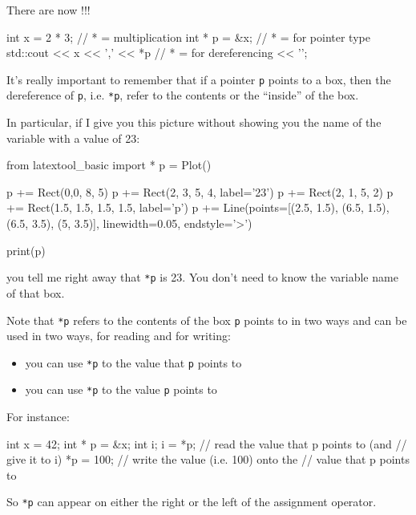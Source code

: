 
There are now !!!

\begin{consolethree}[escapeinside=||]
int x = 2 * 3;           // * = multiplication
int * p = &x;            // * = for pointer type
std::cout << x
          << ',' << *p   // * = for dereferencing
          << '\n';
\end{consolethree}
It's really important to remember that if a pointer \texttt{p} points to a box, then the dereference of \texttt{p}, i.e. \texttt{*p}, refer to the contents or the ``inside'' of the box.

In particular, if I give you this picture without showing you the name of the variable with a value of 23:

\begin{python}
from latextool_basic import *
p = Plot()

p += Rect(0,0, 8, 5)
p += Rect(2, 3, 5, 4, label='23')
p += Rect(2, 1, 5, 2)
p += Rect(1.5, 1.5, 1.5, 1.5, label='p')
p += Line(points=[(2.5, 1.5), (6.5, 1.5), (6.5, 3.5), (5, 3.5)], linewidth=0.05, endstyle='>')

print(p)
\end{python}

you tell me right away that \texttt{*p} is 23. You don't need to know the variable name of that box.

Note that \texttt{*p} refers to the contents of the box \texttt{p} points to in two ways and can be used in two ways, for reading and for writing:

\begin{itemize}
\item
  you can use \texttt{*p} to  the value that \texttt{p} points
  to
\item
  you can use \texttt{*p} to  the value \texttt{p} points
  to
\end{itemize}

For instance:

\begin{consolethree}[escapeinside=||]
int x = 42;
int * p = &x;
int i;
i = *p;         // read the value that p points to (and
                // give it to i)
*p = 100;       // write the value (i.e. 100) onto the
                // value that p points to
\end{consolethree}


So \texttt{*p} can appear on either the right or the left of the
assignment operator.

